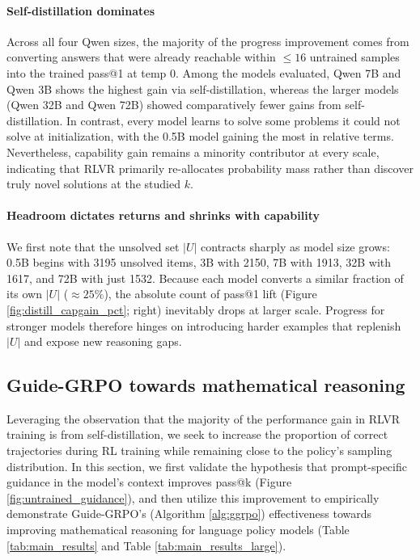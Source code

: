 \documentclass{article}
\begin{document}
\paragraph{Self-distillation dominates} Across all four Qwen sizes, the majority of the progress improvement comes from converting answers that were already reachable within $\le 16$ untrained samples into the trained pass@1 at temp 0. Among the models evaluated, Qwen 7B and Qwen 3B shows the highest gain via self-distillation, whereas the larger models (Qwen 32B and Qwen 72B) showed comparatively fewer gains from self-distillation. In contrast, every model learns to solve some problems it could not solve at initialization, with the 0.5B model gaining the most in relative terms. Nevertheless, capability gain remains a minority contributor at every scale, indicating that RLVR primarily re-allocates probability mass rather than discover truly novel solutions at the studied $k$.

\paragraph{Headroom dictates returns and shrinks with capability} We first note that the unsolved set $|U|$ contracts sharply as model size grows: 0.5B begins with 3195 unsolved items, 3B with 2150, 7B with 1913, 32B with 1617, and 72B with just 1532. Because each model converts a similar fraction of its own $|U|$ ($\approx25\%$), the absolute count of pass@1 lift (Figure \ref{fig:distill_capgain_pct}; right) inevitably drops at larger scale. Progress for stronger models therefore hinges on introducing harder examples that replenish $|U|$ and expose new reasoning gaps.

\subsection{Guide-GRPO towards mathematical reasoning}
\label{sec:guide-exp}

Leveraging the observation that the majority of the performance gain in RLVR training is from self-distillation, we seek to increase the proportion of correct trajectories during RL training while remaining close to the policy's sampling distribution. In this section, we first validate the hypothesis that prompt-specific guidance in the model's context improves pass@k (Figure \ref{fig:untrained_guidance}), and then utilize this improvement to empirically demonstrate Guide-GRPO's (Algorithm \ref{alg:ggrpo}) effectiveness towards improving mathematical reasoning for language policy models (Table \ref{tab:main_results} and Table \ref{tab:main_results_large}).
\end{document}
